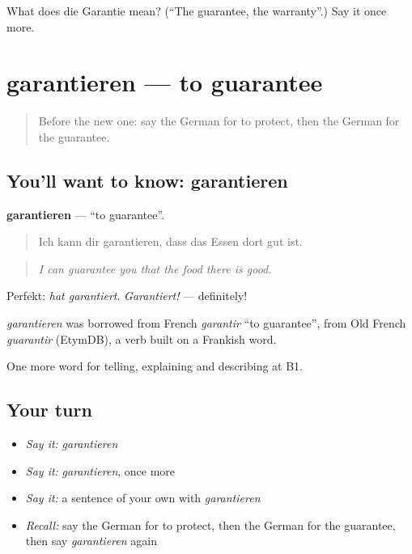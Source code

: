 \begin{tcolorbox}[breakable,colback=teal!4,colframe=teal!35!black,title={Before you move on}]
What does die Garantie mean? (\textquotedblleft{}The guarantee, the warranty\textquotedblright{}.) Say it once more.
\end{tcolorbox}
\section[garantieren]{garantieren — to guarantee}

\label{lesson:GE-C369-garantieren}



\begin{quote}
Before the new one: say the German for to protect, then the German for the guarantee.
\end{quote}

\subsection*{You'll want to know: garantieren}
\textbf{garantieren} — \textquotedblleft{}to guarantee\textquotedblright{}.

\begin{quote}
Ich kann dir garantieren, dass das Essen dort gut ist.
\end{quote}

\begin{quote}
\emph{I can guarantee you that the food there is good.}
\end{quote}

Perfekt: \emph{hat garantiert}. \emph{Garantiert!} — definitely!

\begin{cousinweb}
\emph{garantieren} was borrowed from French \emph{garantir} \textquotedblleft{}to guarantee\textquotedblright{}, from Old French \emph{guarantir} (EtymDB), a verb built on a Frankish word.
\end{cousinweb}

\begin{grammarlens}[title={What you've built}]
One more word for telling, explaining and describing at B1.
\end{grammarlens}

\subsection*{Your turn}
\begin{itemize}
\raggedright
  \item \emph{Say it:} \emph{garantieren}
  \item \emph{Say it:} \emph{garantieren}, once more
  \item \emph{Say it:} a sentence of your own with \emph{garantieren}
  \item \emph{Recall:} say the German for to protect, then the German for the guarantee, then say \emph{garantieren} again
\end{itemize}

